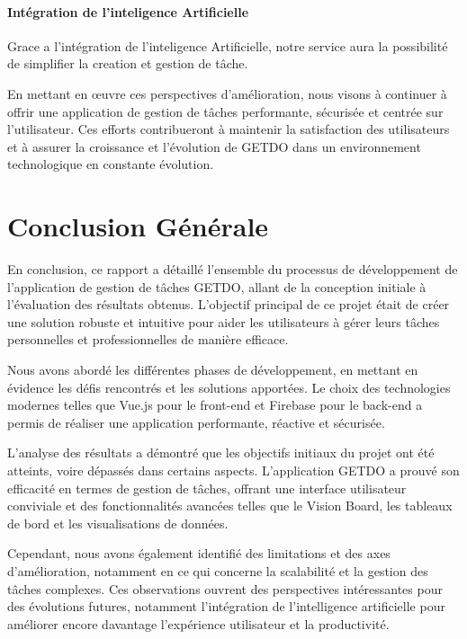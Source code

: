 \documentclass[a4paper,12pt]{report}
\begin{document}
    \subsubsection{Intégration de l'inteligence Artificielle}
    Grace a l'intégration de l'inteligence Artificielle, notre service aura la possibilité de simplifier la creation et gestion de tâche.
    
    En mettant en œuvre ces perspectives d'amélioration, nous visons à continuer à offrir une application de gestion de tâches performante, sécurisée et centrée sur l'utilisateur. Ces efforts contribueront à maintenir la satisfaction des utilisateurs et à assurer la croissance et l'évolution de GETDO dans un environnement technologique en constante évolution.
    
    \chapter*{Conclusion Générale}
    En conclusion, ce rapport a détaillé l’ensemble du processus de développement de l’application de gestion de tâches GETDO, allant de la conception initiale à l’évaluation des résultats obtenus. L’objectif principal de ce projet était de créer une solution robuste et intuitive pour aider les utilisateurs à gérer leurs tâches personnelles et professionnelles de manière efficace.

    Nous avons abordé les différentes phases de développement, en mettant en évidence les défis rencontrés et les solutions apportées. Le choix des technologies modernes telles que Vue.js pour le front-end et Firebase pour le back-end a permis de réaliser une application performante, réactive et sécurisée.

    L’analyse des résultats a démontré que les objectifs initiaux du projet ont été atteints, voire dépassés dans certains aspects. L’application GETDO a prouvé son efficacité en termes de gestion de tâches, offrant une interface utilisateur conviviale et des fonctionnalités avancées telles que le Vision Board, les tableaux de bord et les visualisations de données.

    Cependant, nous avons également identifié des limitations et des axes d’amélioration, notamment en ce qui concerne la scalabilité et la gestion des tâches complexes. Ces observations ouvrent des perspectives intéressantes pour des évolutions futures, notamment l’intégration de l’intelligence artificielle pour améliorer encore davantage l’expérience utilisateur et la productivité.
\end{document}

